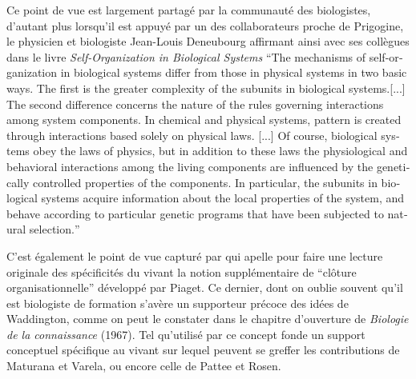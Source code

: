 Ce point de vue est largement partagé par la communauté des biologistes, d'autant plus lorsqu'il est appuyé par un des collaborateurs proche de Prigogine, le physicien et biologiste Jean-Louis Deneubourg affirmant ainsi avec ses collègues dans le livre \textit{Self-Organization in Biological Systems} \foreignquote{english}{The mechanisms of self-organization in biological systems differ from those in physical systems in two basic ways. The first is the greater complexity of the subunits in biological systems.[...] The second difference concerns the nature of the rules governing interactions among system components. In chemical and physical systems, pattern is created through interactions based solely on physical laws. [...] Of course, biological systems obey the laws of physics, but in addition to these laws the physiological and behavioral interactions among the living components are influenced by the genetically controlled properties of the components. In particular, the subunits in biological systems acquire information about the local properties of the system, and behave according to particular genetic programs that have been subjected to natural selection.} \autocite[12-13]{Camazine2003}

C'est également le point de vue capturé par \textcite{Mossio2014} qui apelle pour faire une lecture originale des spécificités du vivant la notion supplémentaire de \enquote{clôture organisationnelle} développé par Piaget. Ce dernier, dont on oublie souvent qu'il est biologiste de formation s'avère un supporteur précoce des idées de Waddington, comme on peut le constater dans le chapitre d'ouverture de \textit{Biologie de la connaissance} (1967). Tel qu'utilisé par \textcite{Mossio2014} ce concept  fonde un support conceptuel spécifique au vivant sur lequel peuvent se greffer les contributions de Maturana et Varela, ou encore celle de Pattee et Rosen.



